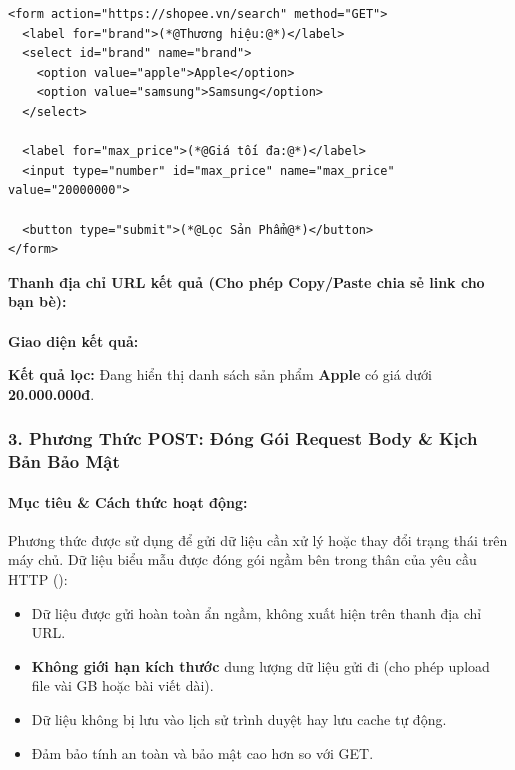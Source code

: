 \begin{codeWindow}
\begin{lstlisting}[language=HTML5]
<form action="https://shopee.vn/search" method="GET">
  <label for="brand">(*@Thương hiệu:@*)</label>
  <select id="brand" name="brand">
    <option value="apple">Apple</option>
    <option value="samsung">Samsung</option>
  </select>

  <label for="max_price">(*@Giá tối đa:@*)</label>
  <input type="number" id="max_price" name="max_price" value="20000000">

  <button type="submit">(*@Lọc Sản Phẩm@*)</button>
</form>
\end{lstlisting}
\end{codeWindow}

\begin{browserWindow}
\sffamily\small
\textbf{Thanh địa chỉ URL kết quả (Cho phép Copy/Paste chia sẻ link cho bạn bè):} \\[3pt]
 \\[8pt]
\textbf{Giao diện kết quả:} \\[4pt]
\begin{tcolorbox}[colback=white, colframe=primaryBlue!20, arc=4pt, boxrule=0.6pt, left=8pt, right=8pt, top=6pt, bottom=6pt]
  \textcolor{darkText}{\textbf{Kết quả lọc:}} Đang hiển thị danh sách sản phẩm \textbf{Apple} có giá dưới \textbf{20.000.000đ}.
\end{tcolorbox}
\end{browserWindow}

\subsubsection{3. Phương Thức POST: Đóng Gói Request Body \& Kịch Bản Bảo Mật}

\paragraph{Mục tiêu \& Cách thức hoạt động:}
Phương thức  được sử dụng để gửi dữ liệu cần xử lý hoặc thay đổi trạng thái trên máy chủ. Dữ liệu biểu mẫu được đóng gói ngầm bên trong thân của yêu cầu HTTP ():
\begin{itemize}[leftmargin=1.8em, itemsep=3pt, parsep=0pt]
    \item Dữ liệu được gửi hoàn toàn ẩn ngầm, không xuất hiện trên thanh địa chỉ URL.
    \item \textbf{Không giới hạn kích thước} dung lượng dữ liệu gửi đi (cho phép upload file vài GB hoặc bài viết dài).
    \item Dữ liệu không bị lưu vào lịch sử trình duyệt hay lưu cache tự động.
    \item Đảm bảo tính an toàn và bảo mật cao hơn so với GET.
\end{itemize}


